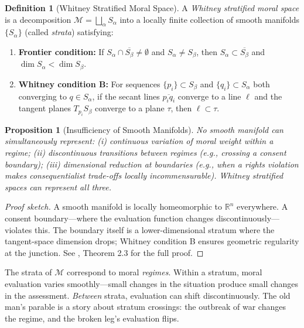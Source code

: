 \documentclass[12pt,letterpaper]{article}
\newtheorem{proposition}[theorem]{Proposition}
\theoremstyle{definition}
\newtheorem{definition}[theorem]{Definition}
\theoremstyle{remark}
\newcommand{\M}{\mathcal{M}}
\newcommand{\R}{\mathbb{R}}
\begin{document}
\begin{definition}[Whitney Stratified Moral Space]
\label{def:whitney}
A \emph{Whitney stratified moral space} is a decomposition $\M = \bigsqcup_{\alpha} S_\alpha$ into a locally finite collection of smooth manifolds $\{S_\alpha\}$ (called \emph{strata}) satisfying:
\begin{enumerate}[label=(\alph*)]
    \item \textbf{Frontier condition:} If $S_\alpha \cap \overline{S_\beta} \neq \emptyset$ and $S_\alpha \neq S_\beta$, then $S_\alpha \subset \overline{S_\beta}$ and $\dim S_\alpha < \dim S_\beta$.
    \item \textbf{Whitney condition B:} For sequences $\{p_i\} \subset S_\beta$ and $\{q_i\} \subset S_\alpha$ both converging to $q \in S_\alpha$, if the secant lines $\overline{p_i q_i}$ converge to a line $\ell$ and the tangent planes $T_{p_i} S_\beta$ converge to a plane $\tau$, then $\ell \subset \tau$.
\end{enumerate}
\end{definition}

\begin{proposition}[Insufficiency of Smooth Manifolds]
\label{prop:smooth_insufficient}
No smooth manifold can simultaneously represent: (i) continuous variation of moral weight within a regime; (ii) discontinuous transitions between regimes (e.g., crossing a consent boundary); (iii) dimensional reduction at boundaries (e.g., when a rights violation makes consequentialist trade-offs locally incommensurable). Whitney stratified spaces can represent all three.
\end{proposition}

\begin{proof}[Proof sketch]
A smooth manifold is locally homeomorphic to $\R^n$ everywhere. A consent boundary---where the evaluation function changes discontinuously---violates this. The boundary itself is a lower-dimensional stratum where the tangent-space dimension drops; Whitney condition B ensures geometric regularity at the junction. See \cite{bond2026sge}, Theorem 2.3 for the full proof.
\end{proof}

The strata of $\M$ correspond to moral \emph{regimes}. Within a stratum, moral evaluation varies smoothly---small changes in the situation produce small changes in the assessment. \emph{Between} strata, evaluation can shift discontinuously. The old man's parable is a story about stratum crossings: the outbreak of war changes the regime, and the broken leg's evaluation flips.
\end{document}
